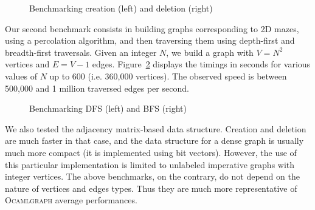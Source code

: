 \documentclass[tfpsymp]{tfp05symp}
\newcommand{\ocamlgraph}{\textsc{Ocamlgraph}\xspace}
\begin{document}
\begin{figure}
  \centering%
  

  
  \caption{Benchmarking creation (left) and deletion (right)}
  \label{fig:bench:build}
\end{figure}

Our second benchmark consists in building graphs corresponding to 2D
mazes, using a percolation algorithm, and then traversing them using
depth-first and breadth-first traversals. Given an integer $N$, we
build a graph with $V=N^2$ vertices and $E=V-1$
edges. Figure~\ref{fig:bench:maze} displays the timings in seconds for various
values of $N$ up to 600 (i.e. 360,000 vertices). The observed speed is
between 500,000 and 1 million traversed edges per second.

% 

\begin{figure}
  \centering%
  

  
  \caption{Benchmarking DFS (left) and BFS (right)}
  \label{fig:bench:maze}
\end{figure}

% 

We also tested the adjacency matrix-based data structure. Creation and
deletion are much faster in that case, and the data structure for
a dense graph is usually much more compact (it is implemented using bit
vectors). However, the use of this particular implementation is
limited to unlabeled imperative graphs with integer vertices. 
The above benchmarks, on the contrary, do not depend on the nature of
vertices and edges types. Thus they are much more representative of
\ocamlgraph average performances.
\end{document}
